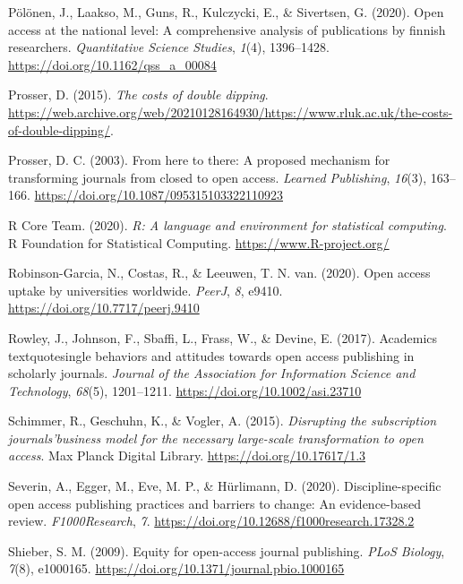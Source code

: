 \documentclass[a4paper,man,floatsintext,longtable,noextraspace,12pt]{apa6}
\newenvironment{CSLReferences}%
  {}%
  {\par}
\begin{document}
\begin{CSLReferences}{1}{0}
\leavevmode\hypertarget{ref-P_l_nen_2020}{}%
Pölönen, J., Laakso, M., Guns, R., Kulczycki, E., \& Sivertsen, G.
(2020). Open access at the national level: A comprehensive analysis of
publications by finnish researchers. \emph{Quantitative Science
Studies}, \emph{1}(4), 1396--1428.
\url{https://doi.org/10.1162/qss_a_00084}

\leavevmode\hypertarget{ref-Prosser_2015}{}%
Prosser, D. (2015). \emph{{The costs of double dipping}}.
\url{https://web.archive.org/web/20210128164930/https://www.rluk.ac.uk/the-costs-of-double-dipping/}.

\leavevmode\hypertarget{ref-Prosser_2003}{}%
Prosser, D. C. (2003). From here to there: A proposed mechanism for
transforming journals from closed to open access. \emph{Learned
Publishing}, \emph{16}(3), 163--166.
\url{https://doi.org/10.1087/095315103322110923}

\leavevmode\hypertarget{ref-r}{}%
R Core Team. (2020). \emph{R: A language and environment for statistical
computing}. R Foundation for Statistical Computing.
\url{https://www.R-project.org/}

\leavevmode\hypertarget{ref-Robinson_Garcia_2020}{}%
Robinson-Garcia, N., Costas, R., \& Leeuwen, T. N. van. (2020). Open
access uptake by universities worldwide. \emph{{PeerJ}}, \emph{8},
e9410. \url{https://doi.org/10.7717/peerj.9410}

\leavevmode\hypertarget{ref-Rowley_2017}{}%
Rowley, J., Johnson, F., Sbaffi, L., Frass, W., \& Devine, E. (2017).
Academics{\hfill\break
textquotesingle} behaviors and attitudes towards open access publishing
in scholarly journals. \emph{Journal of the Association for Information
Science and Technology}, \emph{68}(5), 1201--1211.
\url{https://doi.org/10.1002/asi.23710}

\leavevmode\hypertarget{ref-Schimmer_2015}{}%
Schimmer, R., Geschuhn, K., \& Vogler, A. (2015). \emph{{Disrupting the
subscription journals'business model for the necessary large-scale
transformation to open access}}. Max Planck Digital Library.
\url{https://doi.org/10.17617/1.3}

\leavevmode\hypertarget{ref-Severin_2020}{}%
Severin, A., Egger, M., Eve, M. P., \& Hürlimann, D. (2020).
Discipline-specific open access publishing practices and barriers to
change: An evidence-based review. \emph{F1000Research}, \emph{7}.
\url{https://doi.org/10.12688/f1000research.17328.2}

\leavevmode\hypertarget{ref-Shieber_2009}{}%
Shieber, S. M. (2009). Equity for open-access journal publishing.
\emph{{PLoS} Biology}, \emph{7}(8), e1000165.
\url{https://doi.org/10.1371/journal.pbio.1000165}


\end{CSLReferences}
\end{document}
